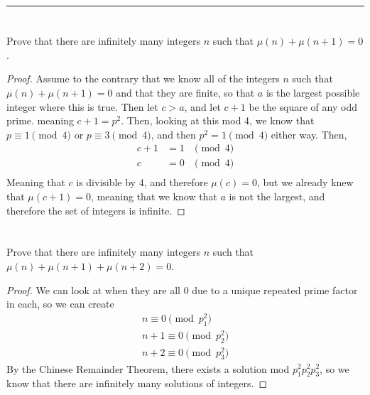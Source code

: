 \documentclass[11pt]{article}
\newenvironment{myproblem}[1][Problem]{\begin{trivlist}
    \item[\hskip \labelsep {\bfseries #1.}]}{\end{trivlist}}
\begin{document}
\hrule

\section{}

\begin{myproblem}
  Prove that there are infinitely many integers $n$ such that $\mu(n) + \mu(n+1)=0$.
\end{myproblem}

\begin{proof}
  Assume to the contrary that we know all of the integers $n$ such that $\mu(n) + \mu(n+1)=0$ and that they are finite, so that $a$ is the largest possible integer where this is true. Then let $c>a$, and let $c+1$ be the square of any odd prime. meaning $c+1 = p^2$. Then, looking at this mod 4, we know that $p\equiv 1\pmod{4}$ or $p\equiv 3\pmod{4}$, and then $p^2=1\pmod{4}$ either way. Then,
  \begin{align*}
    c+1 & = 1 & \pmod{4} \\
    c   & = 0 & \pmod{4} \\
  \end{align*}
  Meaning that $c$ is divisible by 4, and therefore $\mu(c)=0$, but we already knew that $\mu(c+1)=0$, meaning that we know that $a$ is not the largest, and therefore the set of integers is infinite.
\end{proof}



\section{}

\begin{myproblem}
  Prove that there are infinitely many integers $n$ such that $\mu(n)+\mu(n+1)+\mu(n+2)=0$.
\end{myproblem}

\begin{proof}
  We can look at when they are all 0 due to a unique repeated prime factor in each, so we can create
  \begin{align*}
    n \equiv 0 \pmod{p_1^2}   \\
    n+1 \equiv 0 \pmod{p_2^2} \\
    n+2 \equiv 0 \pmod{p_3^2}
  \end{align*}
  By the Chinese Remainder Theorem, there exists a solution mod $p_1^2p_2^2p_3^2$, so we know that there are infinitely many solutions of integers.
\end{proof}
\end{document}
